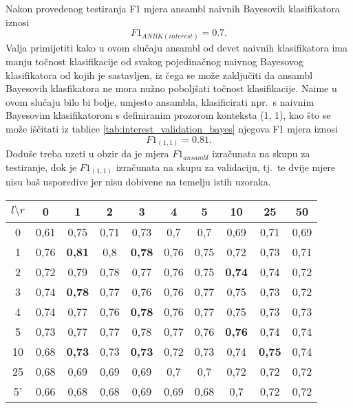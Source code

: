 \documentclass[10pt, a4paper]{article}
\begin{document}
Nakon provedenog testiranja F1 mjera ansambl naivnih Bayesovih klasifikatora
iznosi
\begin{equation}
\label{eq:F1_ansambl}
F1_{ANBK(interest)} = 0.7.
\end{equation}
Valja primijetiti kako u ovom
slučaju ansambl od devet naivnih klasifikatora ima manju točnost klasifikacije
od svakog pojedinačnog naivnog Bayesovog klasifikatora od kojih je sastavljen,
iz čega se može zaključiti da ansambl Bayesovih klasfikatora ne mora nužno poboljšati
točnost klasifikacije. Naime u ovom slučaju bilo bi bolje, umjesto ansambla, klasificirati
npr.~s naivnim Bayesovim klasifikatorom s definiranim prozorom konteksta (1, 1), kao
što se može iščitati iz tablice \ref{tab:interest_validation_bayes} njegova F1 mjera iznosi
\begin{equation}
\label{eq:F1_1_1}
F1_{(1,1)} = 0.81.
\end{equation}
Doduše treba uzeti u obzir da je mjera $F1_{ansambl}$ izračunata na skupu za testiranje,
dok je $F1_{(1,1)}$ izračunata na skupu za validaciju, tj.~te dvije mjere nisu
baš usporedive jer nisu dobivene na temelju istih uzoraka.

\begin{table*}[!hbtp]
\caption{F1 mjere Bayesovih klasifikatora dobivene validacijom za riječ \emph{interest}}
\label{tab:interest_validation_bayes}
\begin{center}
\begin{tabular}{|c|ccccccccc|}
\hline
$l \setminus r$ & 0 & 1 & 2 & 3 & 4 & 5 & 10 & 25 & 50 \\
\hline
0  & 0,61 & 0,75 & 0,71 & 0,73 & 0,7  & 0,7  & 0,69 & 0,71 & 0,69  \\
1  & 0,76 & \textbf{0,81} & 0,8  & \textbf{0,78} & 0,76 & 0,75 & 0,72 & 0,73 & 0,71  \\
2  & 0,72 & 0,79 & 0,78 & 0,77 & 0,76 & 0,75 & \textbf{0,74} & 0,74 & 0,72  \\
3  & 0,74 & \textbf{0,78} & 0,77 & 0,76 & 0,76 & 0,77 & 0,75 & 0,73 & 0,72  \\
4  & 0,74 & 0,77 & 0,76 & \textbf{0,78} & 0,76 & 0,77 & 0,75 & 0,73 & 0,73  \\
5  & 0,73 & 0,77 & 0,77 & 0,78 & 0,77 & 0,76 & \textbf{0,76} & 0,74 & 0,74  \\
10 & 0,68 & \textbf{0,73} & 0,73 & \textbf{0,73} & 0,72 & 0,73 & 0,74 & \textbf{0,75} & 0,74  \\
25 & 0,68 & 0,69 & 0,69 & 0,69 & 0,7  & 0,7  & 0,72 & 0,72 & 0,72  \\
5' & 0,66 & 0,68 & 0,68 & 0,69 & 0,69 & 0,68 & 0,7  & 0,72 & 0,72  \\
\hline
\end{tabular}
\end{center}
\end{table*}
\end{document}
